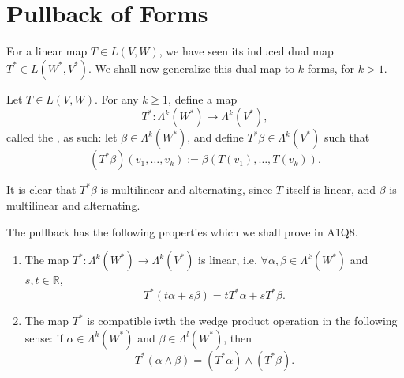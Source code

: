 \documentclass[notoc,notitlepage]{tufte-book}
\begin{document}

\section{Pullback of Forms}%
\label{sec:pullback_of_forms}

For a linear map $T \in L(V, W)$, we have seen its induced dual map
$T^* \in L\left(W^*, V^*\right)$. We shall now generalize this dual map to $k$-forms,
for $k > 1$.

\begin{defn}[Pullback]\label{defn:pullback}
  Let $T \in L(V, W)$. For any $k \geq 1$, define a map
  \begin{equation*}
    T^* : \Lambda^k(W^*) \to \Lambda^k(V^*),
  \end{equation*}
  called the , as such: let $\beta \in \Lambda^k(W^*)$, and define
  $T^* \beta \in \Lambda^k(V^*)$ such that
  \begin{equation*}
    \left( T^* \beta \right)(v_1, \ldots, v_k) := \beta \left( T(v_1), \ldots, T(v_k) \right).
  \end{equation*}
\end{defn}

\begin{note}
  It is clear that $T^* \beta$ is multilinear and alternating, since $T$ itself is
  linear, and $\beta$ is multilinear and alternating.
\end{note}

The pullback has the following properties which we shall prove in A1Q8.

\begin{propo}\label{propo:properties_of_the_pullback}
  \begin{enumerate}
    \item The map $T^* : \Lambda^k(W^*) \to \Lambda^k(V^*)$ is linear, i.e.
      $\forall \alpha, \beta \in \Lambda^k(W^*)$ and $s, t \in \mathbb{R}$,
      \begin{equation}
        T^* (t\alpha + s\beta) = tT^* \alpha + sT^* \beta.
      \end{equation}

    \item The map $T^*$ is compatible iwth the wedge product operation in the
      following sense: if $\alpha \in \Lambda^k(W^*)$ and $\beta \in \Lambda^l(W^*)$,
      then
      \begin{equation*}
        T^* (\alpha \wedge \beta) = \left( T^* \alpha \right) \wedge \left( T^* \beta \right).
      \end{equation*}
  \end{enumerate}
\end{propo}
\end{document}
